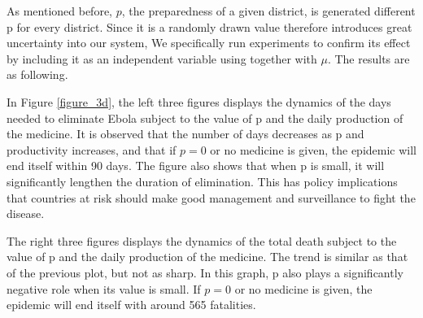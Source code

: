 \documentclass[12pt,a4paper,titlepage]{article}
\begin{document}
As mentioned before, $p$, the preparedness of a given district, is generated different p for every district. Since it is a randomly drawn value therefore introduces great uncertainty into our system, We specifically run experiments to confirm its effect by including it as an independent variable using together with $\mu$. The results are as following. 


In Figure \ref{figure_3d}, the left three figures displays the dynamics of the days needed to eliminate Ebola subject to the value of p and the daily production of the medicine. It is observed that the number of days decreases as p and productivity increases, and that if $p=0$ or no medicine is given, the epidemic will end itself within 90 days. The figure also shows that when p is small, it will significantly lengthen the duration of elimination. This has policy implications that countries at risk should make good management and surveillance to fight the disease.

The right three figures displays the dynamics of the total death subject to the value of p and the daily production of the medicine. The trend is similar as that of the previous plot, but not as sharp. In this graph, p also plays a significantly negative role when its value is small. If $p=0$ or no medicine is given, the epidemic will end itself with around 565 fatalities.
\end{document}
